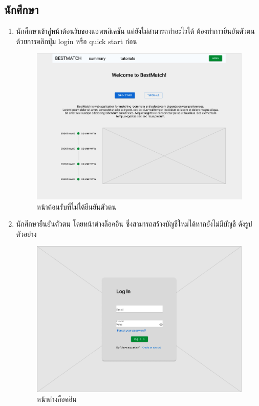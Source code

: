 \subsection{นักศึกษา}
\begin{enumerate}
  \item นักศึกษาเข้าสู่หน้าต้อนรับของแอพพลิเคชัน แต่ยังไม่สามารถทำอะไรได้ ต้องทำการยืนยันตัวตนด้วยการคลิกปุ่ม login หรือ quick start ก่อน
        \begin{figure}[ht]
          \begin{center}
            \includegraphics[width=\linewidth]{photo/student/home.png}
          \end{center}
          \caption{หน้าต้อนรับที่ไม่ได้ยืนยันตัวตน}
          \label{fig:homepage}
        \end{figure}
        \clearpage
  \item นักศึกษายืนยันตัวตน โดยหน้าต่างล็อคอิน ซึ่งสามารถสร้างบัญชีใหม่ได้หากยังไม่มีบัญชี ดังรูปตัวอย่าง
        \begin{figure}[ht]
          \begin{center}
            \includegraphics[width=\linewidth]{photo/student/login.png}
          \end{center}
          \caption{หน้าต่างล็อคอิน}
          \label{fig:login}
        \end{figure}
        

\end{enumerate}
